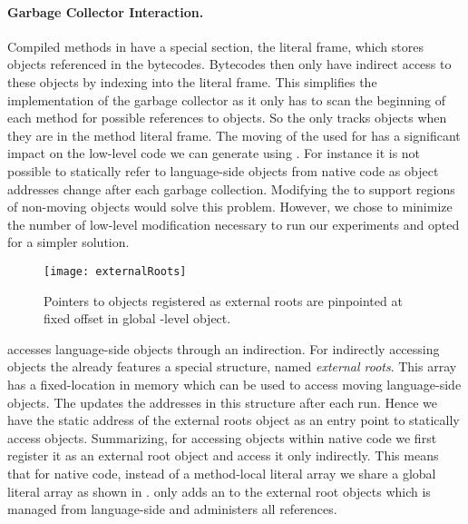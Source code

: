 \paragraph{Garbage Collector Interaction.}

Compiled methods in \PH have a special section, the literal frame, which stores objects referenced in the bytecodes.
Bytecodes then only have indirect access to these objects by indexing into the literal frame.
This simplifies the implementation of the garbage collector as it only has to scan the beginning of each method for possible references to objects. 
So the \GC only tracks \PH objects when they are in the method literal frame. 
The moving \GC of the \VM used for \PH has a significant impact on the low-level code we can generate using \B.
For instance it is not possible to statically refer to language-side objects from native code as object addresses change after each garbage collection.
Modifying the \GC to support regions of non-moving objects would solve this problem.
However, we chose to minimize the number of low-level \VM modification necessary to run our experiments and opted for a simpler solution.

\begin{figure}[ht]
	\centering
	\texttt{[image: externalRoots]}
	\caption[Benzo External Roots]{Pointers to objects registered as external roots are pinpointed at fixed offset in global \VM-level object.
	}
\end{figure}

\noindent \B accesses language-side objects through an indirection.
For indirectly accessing objects the \PH \VM already features a special structure, named \emph{external roots}.
This array has a fixed-location in memory which can be used to access moving language-side objects.
The \GC updates the addresses in this \VM structure after each run.
Hence we have the static address of the external roots object as an entry point to statically access \PH objects.
Summarizing, for accessing \PH objects within native code we first register it as an external root object and access it only indirectly.
This means that for native code, instead of a method-local literal array we share a global literal array as shown in . 
\B only adds an  to the external root objects which is managed from language-side and administers all references.

